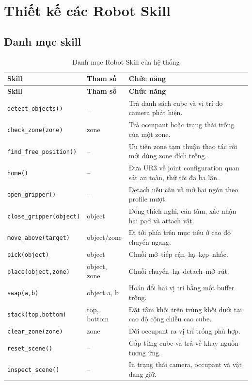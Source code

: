 \documentclass[a4paper,12pt]{article}
\newcommand{\skill}[1]{\texttt{#1}}
\begin{document}
\section{Thiết kế các Robot Skill}

\subsection{Danh mục skill}
\begin{longtable}{p{}p{}p{}}
\caption{Danh mục Robot Skill của hệ thống}\label{tab:skills}\\
\toprule
\textbf{Skill} & \textbf{Tham số} & \textbf{Chức năng}\\
\midrule
\endfirsthead
\toprule
\textbf{Skill} & \textbf{Tham số} & \textbf{Chức năng}\\
\midrule
\endhead
\skill{detect\_objects()} & -- & Trả danh sách cube và vị trí do camera phát hiện.\\
\skill{check\_zone(zone)} & zone & Trả occupant hoặc trạng thái trống của một zone.\\
\skill{find\_free\_position()} & -- & Ưu tiên zone tạm thuận thao tác rồi mới dùng zone đích trống.\\
\skill{home()} & -- & Đưa UR3 về joint configuration quan sát an toàn, thử tối đa ba lần.\\
\skill{open\_gripper()} & -- & Detach nếu cần và mở hai ngón theo profile mượt.\\
\skill{close\_gripper(object)} & object & Đóng thích nghi, căn tâm, xác nhận hai pad và attach vật.\\
\skill{move\_above(target)} & object/zone & Đi tới phía trên mục tiêu ở cao độ chuyển ngang.\\
\skill{pick(object)} & object & Chuỗi mở--tiếp cận--hạ--kẹp--nhấc.\\
\skill{place(object,zone)} & object, zone & Chuỗi chuyển--hạ--detach--mở--rút.\\
\skill{swap(a,b)} & object a, b & Hoán đổi hai vị trí bằng một buffer trống.\\
\skill{stack(top,bottom)} & top, bottom & Đặt tâm khối trên trùng khối dưới tại cao độ cộng chiều cao cube.\\
\skill{clear\_zone(zone)} & zone & Dời occupant ra vị trí trống phù hợp.\\
\skill{reset\_scene()} & -- & Gắp từng cube và trả về khay nguồn tương ứng.\\
\skill{inspect\_scene()} & -- & In trạng thái camera, occupant và vật đang giữ.\\
\bottomrule
\end{longtable}
\end{document}
